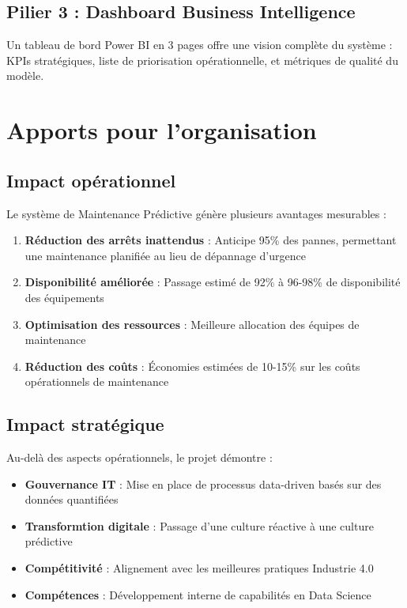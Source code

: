 \documentclass[a4paper,12pt,twoside]{report}
\begin{document}
\subsection{Pilier 3 : Dashboard Business Intelligence}

Un tableau de bord Power BI en 3 pages offre une vision complète du système : KPIs stratégiques, liste de priorisation opérationnelle, et métriques de qualité du modèle.

\section{Apports pour l'organisation}

\subsection{Impact opérationnel}

Le système de Maintenance Prédictive génère plusieurs avantages mesurables :

\begin{enumerate}
    \item \textbf{Réduction des arrêts inattendus} : Anticipe 95\% des pannes, permettant une maintenance planifiée au lieu de dépannage d'urgence
    \item \textbf{Disponibilité améliorée} : Passage estimé de 92\% à 96-98\% de disponibilité des équipements
    \item \textbf{Optimisation des ressources} : Meilleure allocation des équipes de maintenance
    \item \textbf{Réduction des coûts} : Économies estimées de 10-15\% sur les coûts opérationnels de maintenance
\end{enumerate}

\subsection{Impact stratégique}

Au-delà des aspects opérationnels, le projet démontre :

\begin{itemize}
    \item \textbf{Gouvernance IT} : Mise en place de processus data-driven basés sur des données quantifiées
    \item \textbf{Transformtion digitale} : Passage d'une culture réactive à une culture prédictive
    \item \textbf{Compétitivité} : Alignement avec les meilleures pratiques Industrie 4.0
    \item \textbf{Compétences} : Développement interne de capabilités en Data Science
\end{itemize}
\end{document}
